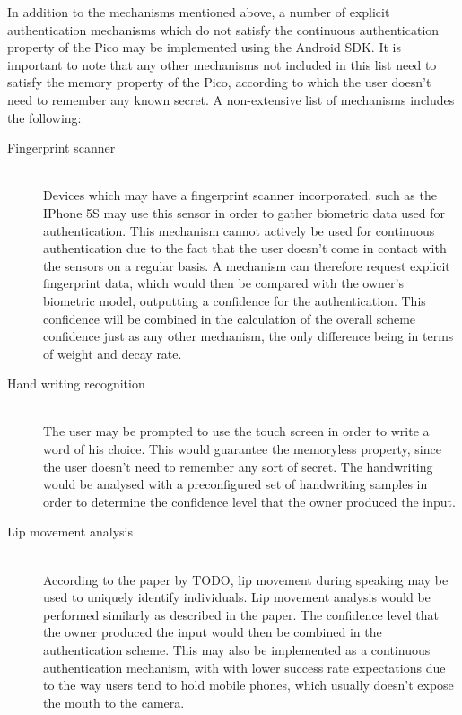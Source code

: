 In addition to the mechanisms mentioned above, a number of explicit authentication mechanisms which do not satisfy the continuous authentication property of the Pico may be implemented using the Android SDK. It is important to note that any other mechanisms not included in this list need to satisfy the memory property of the Pico, according to which the user doesn't need to remember any known secret. A non-extensive list of mechanisms includes the following:
\begin{description}
  \item[Fingerprint scanner] \hfill \\
  Devices which may have a fingerprint scanner incorporated, such as the IPhone 5S may use this sensor in order to gather biometric data used for authentication. This mechanism cannot actively be used for continuous authentication due to the fact that the user doesn't come in contact with the sensors on a regular basis. A mechanism can therefore request explicit fingerprint data, which would then be compared with the owner's biometric model, outputting a confidence for the authentication. This confidence will be combined in the calculation of the overall scheme confidence just as any other mechanism, the only difference being in terms of weight and decay rate.
    
  \item[Hand writing recognition] \hfill \\
  The user may be prompted to use the touch screen in order to write a word of his choice. This would guarantee the memoryless property, since the user doesn't need to remember any sort of secret. The handwriting would be analysed with a preconfigured set of handwriting samples in order to determine the confidence level that the owner produced the input.
  
  \item[Lip movement analysis] \hfill \\
  According to the paper \cite{} by TODO, lip movement during speaking may be used to uniquely identify individuals. Lip movement analysis would be performed similarly as described in the paper. The confidence level that the owner produced the input would then be combined in the authentication scheme. This may also be implemented as a continuous authentication mechanism, with with lower success rate expectations due to the way users tend to hold mobile phones, which usually doesn't expose the mouth to the camera.
\end{description}

